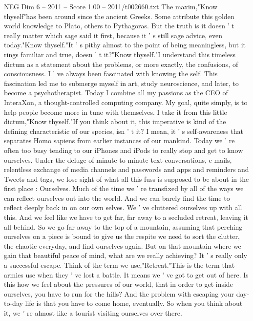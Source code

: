 \begin{textsample}{NEG Dim 6 – 2011 – Score 1.00 – 2011/t002660.txt}  \label{ex:f6_neg_047}
The maxim,"Know thyself"has been around since the ancient Greeks.
Some attribute this golden world knowledge to Plato, others to Pythagoras.
But the truth is it doesn ' t really matter which sage said it first, because it ' s still sage advice, even today."Know thyself."It ' s pithy almost to the point of being meaningless, but it rings familiar and true, doesn ' t it?"Know thyself."I understand this timeless dictum as a statement about the problems, or more exactly, the confusions, of consciousness.
I ' ve always been fascinated with knowing the self.
This fascination led me to submerge myself in art, study neuroscience, and later, to become a psychotherapist.
Today I combine all my passions as the CEO of InteraXon, a thought-controlled computing company.
My goal, quite simply, is to help people become more in tune with themselves.
I take it from this little dictum,"Know thyself."If you think about it, this imperative is kind of the defining characteristic of our species, isn ' t it?
I mean, it ' s self-awareness that separates Homo sapiens from earlier instances of our mankind.
Today we ' re often too busy tending to our iPhones and iPods to really stop and get to know ourselves.
Under the deluge of minute-to-minute text conversations, e-mails, relentless exchange of media channels and passwords and apps and reminders and Tweets and tags, we lose sight of what all this fuss is supposed to be about in the first place : Ourselves.
Much of the time we ' re transfixed by all of the ways we can reflect ourselves out into the world.
And we can barely find the time to reflect deeply back in on our own selves.
We ' ve cluttered ourselves up with all this.
And we feel like we have to get far, far away to a secluded retreat, leaving it all behind.
So we go far away to the top of a mountain, assuming that perching ourselves on a piece is bound to give us the respite we need to sort the clutter, the chaotic everyday, and find ourselves again.
But on that mountain where we gain that beautiful peace of mind, what are we really achieving?
It ' s really only a successful escape.
Think of the term we use,"Retreat."This is the term that armies use when they ' ve lost a battle.
It means we ' ve got to get out of here.
Is this how we feel about the pressures of our world, that in order to get inside ourselves, you have to run for the hills?
And the problem with escaping your day-to-day life is that you have to come home, eventually.
So when you think about it, we ' re almost like a tourist visiting ourselves over there.

\end{textsample}
